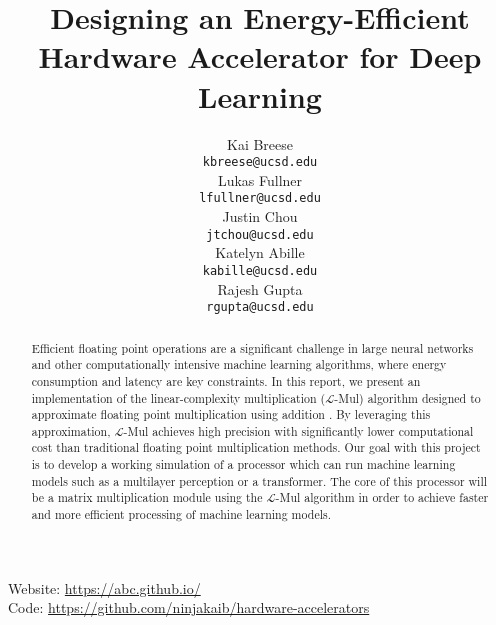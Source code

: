 \documentclass[12pt,letterpaper]{article}
\title{Designing an Energy-Efficient Hardware Accelerator for Deep Learning}
\author{Kai Breese \\
  {\tt kbreese@ucsd.edu} \\\And
  Lukas Fullner \\
  {\tt lfullner@ucsd.edu} \\\And
  Justin Chou \\
  {\tt jtchou@ucsd.edu} \\\And
  Katelyn Abille \\
  {\tt kabille@ucsd.edu} \\\And
  Rajesh Gupta \\
  {\tt rgupta@ucsd.edu} \\}
\newcommand{\lmul}{$\mathcal{L}$-Mul\xspace}
\begin{document}
\maketitle



\begin{abstract}
    
Efficient floating point operations are a significant challenge in large neural networks and other computationally intensive machine learning algorithms, where energy consumption and latency are key constraints. In this report, we present an implementation of the linear-complexity multiplication (\lmul) algorithm designed to approximate floating point multiplication using addition \citep{luo2024addition}. By leveraging this approximation, \lmul achieves high precision with significantly lower computational cost than traditional floating point multiplication methods.  Our goal with this project is to develop a working simulation of a processor which can run machine learning models such as a multilayer perception or a transformer.  The core of this processor will be a matrix multiplication module using the \lmul algorithm in order to achieve faster and more efficient processing of machine learning models.
    
\end{abstract}

\begin{center}
Website: \url{https://abc.github.io/} \\
Code: \url{https://github.com/ninjakaib/hardware-accelerators}
\end{center}

\maketoc
\clearpage

\end{document}
